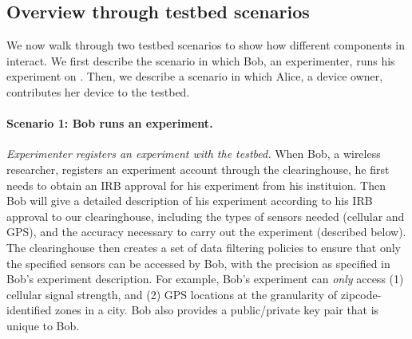 \subsection{Overview through testbed scenarios}
\label{sec-uses}

We now walk through two testbed scenarios to show how different
components in \sysname interact. We first describe the scenario in
which Bob, an experimenter, runs his experiment on \sysname. 
Then, we describe a scenario in which Alice, a device owner,
contributes her device to the testbed.

%
%


\paragraph{Scenario 1: Bob runs an experiment.}

\emph{Experimenter registers an experiment with the testbed.} 
When Bob, a wireless researcher, registers an experiment account 
through the \sysname clearinghouse, he first needs to obtain an IRB 
approval for his experiment from his instituion. Then Bob will give 
a detailed description of his experiment according to his IRB approval 
to our clearinghouse, 
including the types of sensors needed (cellular and GPS), 
and the accuracy necessary to carry out the experiment (described 
below). The \sysname clearinghouse then creates 
a set of data filtering policies to ensure that only the specified 
sensors can be accessed by Bob, with the precision 
as specified in Bob's experiment description. For example, Bob's 
experiment can \textit{only} access (1) cellular signal strength, and (2) 
GPS locations at the granularity of zipcode-identified zones in a city. 
Bob also provides a public/private key pair that is unique to Bob.

